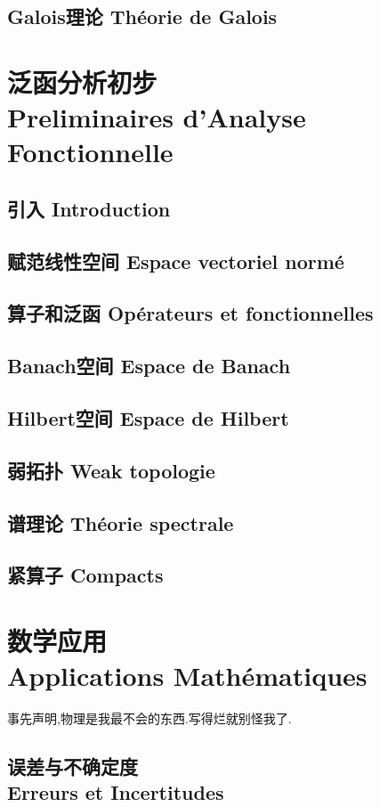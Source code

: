 \documentclass[12pt, a4paper, oneside]{ctexbook}
\begin{document}
  \chapter{Galois理论 Théorie de Galois}

  \part{泛函分析初步 \\Preliminaires d'Analyse Fonctionnelle}
  \chapter{引入 Introduction}
  \chapter{赋范线性空间 Espace vectoriel normé}
  \chapter{算子和泛函 Opérateurs et fonctionnelles}
  \chapter{Banach空间 Espace de Banach}
  \chapter{Hilbert空间 Espace de Hilbert}
  \chapter{弱拓扑 Weak topologie}
  \chapter{谱理论 Théorie spectrale}
  \chapter{紧算子 Compacts}

  \part{数学应用\\ Applications Mathématiques}
  事先声明,物理是我最不会的东西.写得烂就别怪我了.
  \chapter{误差与不确定度\\Erreurs et Incertitudes}
\end{document}
